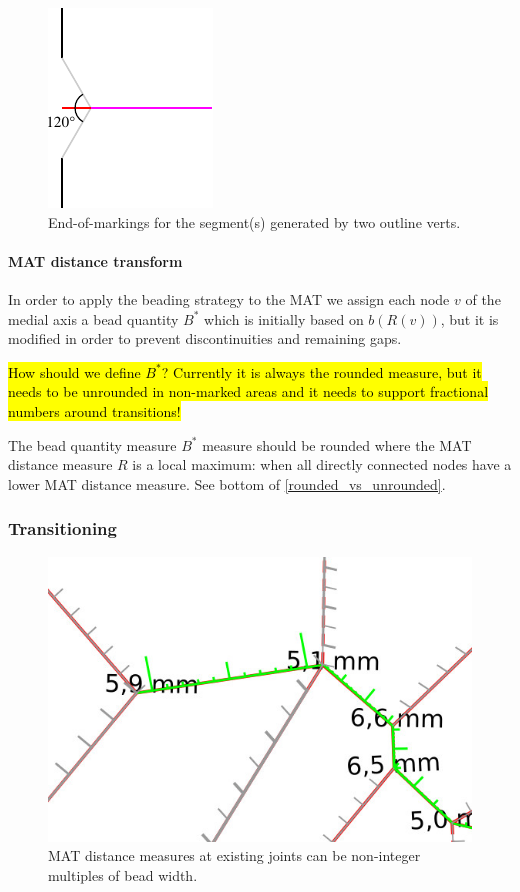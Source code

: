 \begin{figure}[H]
\centering
\includegraphics[width=.3\columnwidth]{sources/method/end_of_markings_point_point.pdf}
\caption{End-of-markings for the segment(s) generated by two outline verts.}
\label{end_of_markings_point_point}
\end{figure}








\paragraph{MAT distance transform}
In order to apply the beading strategy to the MAT
we assign each node $v$ of the medial axis a bead quantity $B^*$ which is initially based on $b(R(v))$, but it is modified in order to prevent discontinuities and remaining gaps.

\hl{How should we define $B^*$? Currently it is always the rounded measure, but it needs to be unrounded in non-marked areas and it needs to support fractional numbers around transitions!}

The bead quantity measure $B^*$ measure should be rounded
where the MAT distance measure $R$ is a local maximum: when all directly connected nodes have a lower MAT distance measure.
See bottom of \cref{rounded_vs_unrounded}.



\subsubsection{Transitioning}

\begin{figure}
\centering
\includegraphics[width=.6\columnwidth]{sources/method/rounded_dist_measures.jpg}
\caption{MAT distance measures at existing joints can be non-integer multiples of bead width.}
\label{rounded_dist_measures}
\end{figure}

